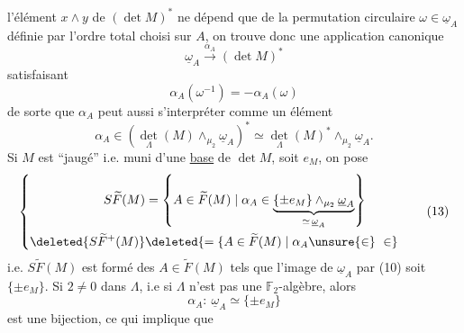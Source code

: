 l'élément $x\wedge y$ de $(\det M)^*$ ne dépend que de la permutation circulaire $\omega\in\underline{\omega}_A$ définie par l'ordre total choisi sur $A$, on trouve donc une application canonique
\[
\underline{\omega}_A\xrightarrow{\alpha_A}(\det M)^*\tag*{(10)}
\]
satisfaisant
\[
\alpha_A(\omega^{-1})=-\alpha_A(\omega)\tag*{(11)}
\]
de sorte que $\alpha_A$ peut aussi s'interpréter comme un élément
\[
\alpha_A\in\left(\det_{\Lambda}(M)\wedge_{\mu_2}\underline{\omega}_A\right)^*\simeq
\det_{\Lambda}(M)^*\wedge_{\mu_2}\underline{\omega}_A.\tag*{(12)}
\]
 Si $M$ est ``jaugé'' i.e. muni d'une \uline{base} de $\det M$, soit $e_M$, on pose
\[
\left\{\begin{aligned}
S\widetilde F(M)&=\left\{A\in\widetilde F(M)\mid\alpha_A\in
\underbrace{\{\pm e_M\}\wedge_{\mu_2}\underline{\omega}_A}_{\simeq\,\underline{\omega}_A}\right\}\\
\deleted{S\widetilde F^+(M)}&\deleted{=\{A\in\widetilde F(M)\mid\alpha_A\unsure{\in}\ \in}
\end{aligned}\right.\tag*{(13)}
\]
i.e. $S\widetilde F(M)$ est formé des $A\in\widetilde F(M)$ tels que l'image de $\underline{\omega}_A$ par (10) soit $\{\pm e_M\}$. Si $2\ne0$ dans $\Lambda$, i.e si $\Lambda$ n'est pas une $\mathbb F_2$-algèbre, alors 
\[
\alpha_A:\ \underline{\omega}_A\simeq\{\pm e_M\}
\]
est une bijection, ce qui implique que
